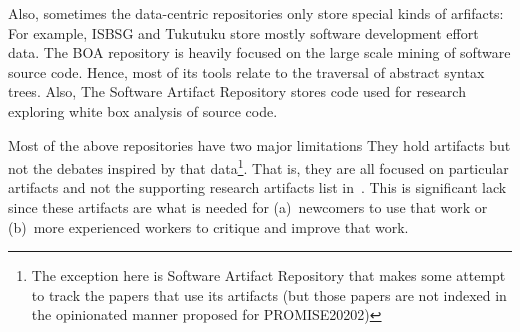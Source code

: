 Also, sometimes the data-centric repositories only store special kinds of arfifacts:
For example, ISBSG and Tukutuku store mostly 
software development  effort data.  
The BOA repository is heavily focused on the large scale mining of software source code. Hence, most
of its tools relate to the traversal of abstract syntax trees.
Also,
The Software Artifact Repository stores code
used for research exploring white box analysis of source code. 


Most of the above repositories have two major limitations
They hold artifacts  but not
the debates inspired by that data\footnote{The exception here is Software Artifact Repository  that makes
some attempt to track the papers that use its artifacts (but those papers are not indexed
in the opinionated manner proposed for PROMISE20202)}.
That is,
they are all  focused on particular artifacts and not the supporting research artifacts list in~.
This is significant lack since these artifacts are what is needed
for (a)~newcomers to use that work or (b)~more experienced workers to critique and improve that work.



